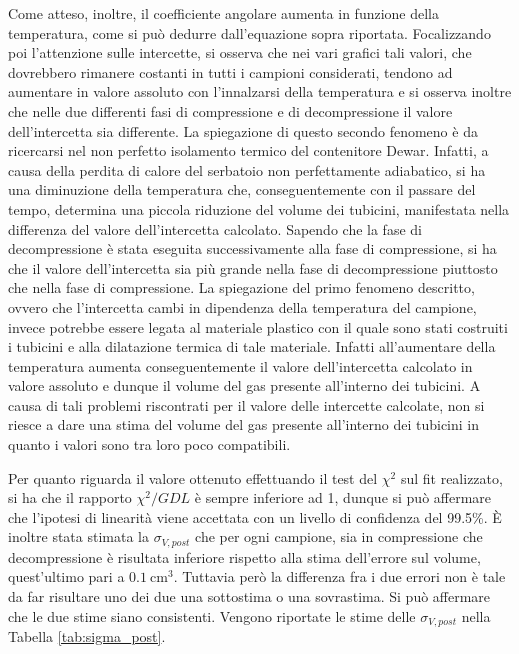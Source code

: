 \documentclass[a4paper,11pt,oneside]{article}
\begin{document}
Come atteso, inoltre, il coefficiente angolare aumenta in funzione della temperatura, come si può dedurre dall'equazione sopra riportata.
Focalizzando poi l'attenzione sulle intercette, si osserva che nei vari grafici tali valori, che dovrebbero rimanere costanti in tutti i campioni considerati, tendono ad aumentare in valore assoluto con l'innalzarsi della temperatura e si osserva inoltre che nelle due differenti fasi di compressione e di decompressione il valore dell'intercetta sia differente. La spiegazione di questo secondo fenomeno è da ricercarsi nel non perfetto isolamento termico del contenitore Dewar. Infatti, a causa della perdita di calore del serbatoio non perfettamente adiabatico, si ha una diminuzione della temperatura che, conseguentemente con il passare del tempo, determina una piccola riduzione del volume dei tubicini, manifestata nella differenza del valore dell'intercetta calcolato. Sapendo che la fase di decompressione è stata eseguita successivamente alla fase di compressione, si ha che il valore dell'intercetta sia più grande nella fase di decompressione piuttosto che nella fase di compressione. La spiegazione del primo fenomeno descritto, ovvero che l'intercetta cambi in dipendenza della temperatura del campione, invece potrebbe essere legata al materiale plastico con il quale sono stati costruiti i tubicini e alla dilatazione termica di tale materiale. Infatti all'aumentare della temperatura aumenta conseguentemente il valore dell'intercetta calcolato in valore assoluto e dunque il volume del gas presente all'interno dei tubicini. A causa di tali problemi riscontrati per il valore delle intercette calcolate, non si riesce a dare una stima del volume del gas presente all'interno dei tubicini in quanto i valori sono tra loro poco compatibili.

Per quanto riguarda il valore ottenuto effettuando il test del $\chi^2$ sul fit realizzato, si ha che il rapporto $\chi^2/GDL$ è sempre inferiore ad 1, dunque si può affermare che l'ipotesi di linearità viene accettata con un livello di confidenza del 99.5\%.
È inoltre stata stimata la $\sigma_{V, post}$ che per ogni campione, sia in compressione che decompressione è risultata inferiore rispetto alla stima dell'errore sul volume, quest'ultimo pari a $\SI{0.1}{\centi\meter\cubed}$. Tuttavia però la differenza fra i due errori non è tale da far risultare uno dei due una sottostima o una sovrastima. Si può affermare che le due stime siano consistenti. Vengono riportate le stime delle $\sigma_{V, post}$ nella Tabella \ref{tab:sigma_post}.
\end{document}
